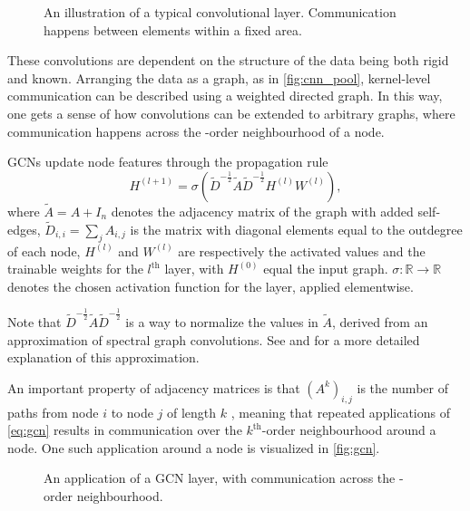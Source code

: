 \begin{figure}[!h]
    \centering
    \resizebox{!}{4cm}{}
    \caption{An illustration of a typical convolutional layer. Communication happens between elements within a fixed area.}
    \label{fig:cnn_pool}
\end{figure}

These convolutions are dependent on the structure of the data being both rigid and known.
Arranging the data as a graph, as in \autoref{fig:cnn_pool}, kernel-level communication can be described using a weighted directed graph.
In this way, one gets a sense of how convolutions can be extended to arbitrary graphs, where communication happens across the -order neighbourhood of a node.

GCNs update node features through the propagation rule
\begin{equation}\label{eq:gcn}
    H^{(l+1)} = \sigma \left( \tilde{D}^{-\frac{1}{2}} \tilde{A} \tilde{D}^{-\frac{1}{2}} H^{(l)} W^{(l)} \right),
\end{equation}
where $\tilde{A} = A + I_n$ denotes the adjacency matrix of the graph with added self-edges, $\tilde{D}_{i,i} = \sum_j A_{i,j}$ is the matrix with diagonal elements equal to the outdegree of each node, $H^{(l)}$ and $W^{(l)}$ are respectively the activated values and the trainable weights for the $l^{\text{th}}$ layer, with $H^{(0)}$ equal the input graph.
$\sigma : \mathbb{R} \to \mathbb{R}$ denotes the chosen activation function for the layer, applied elementwise.

Note that $\tilde{D}^{-\frac{1}{2}} \tilde{A} \tilde{D}^{-\frac{1}{2}}$ is a way to normalize the values in $\tilde{A}$, derived from an approximation of spectral graph convolutions.
See \textcite{kipf2017semisupervised} and \textcite{spectralGraph} for a more detailed explanation of this approximation.

An important property of adjacency matrices is that $(A^k)_{i,j}$ is the number of paths from node $i$ to node $j$ of length $k$ \cite[p.~125]{aigner2023discrete}, meaning that repeated applications of \eqref{eq:gcn} results in communication over the $k^{\text{th}}$-order neighbourhood around a node.
One such application around a node is visualized in \autoref{fig:gcn}.

\begin{figure}[!h]
    \centering
    \resizebox{!}{4cm}{}
    \caption{An application of a GCN layer, with communication across the -order neighbourhood.}
    \label{fig:gcn}
\end{figure}

